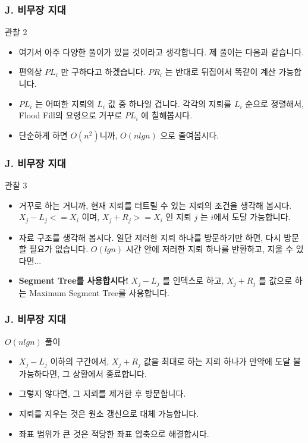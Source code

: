 \documentclass{beamer}
\begin{document}
\begin{frame}
	\frametitle{J. 비무장 지대}
	\begin{block}{관찰 2}
		\begin{itemize}
			\item 여기서 아주 다양한 풀이가 있을 것이라고 생각합니다. 제 풀이는 다음과 같습니다.
			\item 편의상 $PL_i$ 만 구하다고 하겠습니다. $PR_i$ 는 반대로 뒤집어서 똑같이 계산 가능합니다.
			\item $PL_i$ 는 어떠한 지뢰의 $L_i$ 값 중 하나일 겁니다. 각각의 지뢰를 $L_i$ 순으로 정렬해서, Flood Fill의 요령으로 거꾸로 $PL_i$ 에 칠해봅시다. 
			\item 단순하게 하면 $O(n^2)$니까, $O(nlgn)$ 으로 줄여봅시다. 
		\end{itemize}
	\end{block}
\end{frame}


\begin{frame}
	\frametitle{J. 비무장 지대}
	\begin{block}{관찰 3}
		\begin{itemize}
			\item 거꾸로 하는 거니까, 현재 지뢰를 터트릴 수 있는 지뢰의 조건을 생각해 봅시다. $X_j - L_j <= X_i$ 이며, $X_j + R_j >= X_i$ 인 지뢰 $j$ 는 $i$에서 도달 가능합니다.
			\item 자료 구조를 생각해 봅시다. 일단 저러한 지뢰 하나를 방문하기만 하면, 다시 방문할 필요가 없습니다. $O(lgn)$ 시간 안에 저러한 지뢰 하나를 반환하고, 지울 수 있다면...
			\item \textbf{Segment Tree를 사용합시다!} $X_j - L_j$ 를 인덱스로 하고, $X_j + R_j$ 를 값으로 하는 Maximum Segment Tree를 사용합니다. 
		\end{itemize}
	\end{block}
\end{frame}


\begin{frame}
	\frametitle{J. 비무장 지대}
	\begin{block}{$O(nlgn)$ 풀이}
		\begin{itemize}
			\item $X_j - L_j$ 이하의 구간에서, $X_j + R_j$ 값을 최대로 하는 지뢰 하나가 만약에 도달 불가능하다면, 그 상황에서 종료합니다.
			\item 그렇지 않다면, 그 지뢰를 제거한 후 방문합니다. 
			\item 지뢰를 지우는 것은 원소 갱신으로 대체 가능합니다.
			\item 좌표 범위가 큰 것은 적당한 좌표 압축으로 해결합시다.
		\end{itemize}
	\end{block}
\end{frame}
\end{document}
